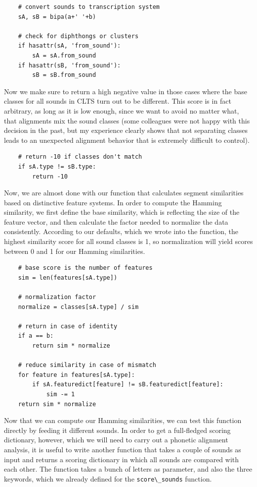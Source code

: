 \documentclass[
  a4paper,
  14pt,
  oneside,
  tablecaptionabove
]{scrbook}
\newcommand{\passthrough}[1]{#1}
\begin{document}
\begin{lstlisting}
    # convert sounds to transcription system
    sA, sB = bipa(a+' '+b)

    # check for diphthongs or clusters
    if hasattr(sA, 'from_sound'):
        sA = sA.from_sound
    if hasattr(sB, 'from_sound'):
        sB = sB.from_sound
\end{lstlisting}

Now we make sure to return a high negative value in those cases where
the base classes for all sounds in CLTS turn out to be different. This
score is in fact arbitrary, as long as it is low enough, since we want
to avoid no matter what, that alignments mix the sound classes (some
colleagues were not happy with this decision in the past, but my
experience clearly shows that not separating classes leads to an
unexpected alignment behavior that is extremely difficult to control).

\begin{lstlisting}
    # return -10 if classes don't match
    if sA.type != sB.type:
        return -10
\end{lstlisting}

Now, we are almost done with our function that calculates segment
similarities based on distinctive feature systems. In order to compute
the Hamming similarity, we first define the base similarity, which is
reflecting the size of the feature vector, and then calculate the factor
needed to normalize the data consistently. According to our defaults,
which we wrote into the function, the highest similarity score for all
sound classes is 1, so normalization will yield scores between 0 and 1
for our Hamming similarities.

\begin{lstlisting}
    # base score is the number of features
    sim = len(features[sA.type])

    # normalization factor
    normalize = classes[sA.type] / sim

    # return in case of identity
    if a == b:
        return sim * normalize

    # reduce similarity in case of mismatch
    for feature in features[sA.type]:
        if sA.featuredict[feature] != sB.featuredict[feature]:
            sim -= 1
    return sim * normalize
\end{lstlisting}

Now that we can compute our Hamming similarities, we can test this
function directly by feeding it different sounds. In order to get a
full-fledged scoring dictionary, however, which we will need to carry
out a phonetic alignment analysis, it is useful to write another
function that takes a couple of sounds as input and returns a scoring
dictionary in which all sounds are compared with each other. The
function takes a bunch of letters as parameter, and also the three
keywords, which we already defined for the
\passthrough{\lstinline!score\_sounds!} function.
\end{document}
